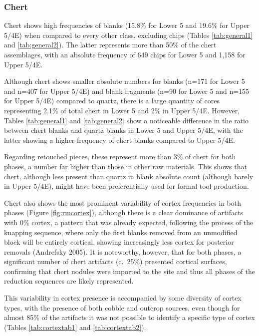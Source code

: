 \documentclass[12pt,twoside]{reedthesis}
\begin{document}
\hypertarget{chert}{%
\subsubsection{Chert}\label{chert}}

Chert shows high frequencies of blanks (15.8\% for Lower 5 and 19.6\% for Upper 5/4E) when compared to every other class, excluding chips (Tables \ref{tab:general1} and \ref{tab:general2}). The latter represents more than 50\% of the chert assemblages, with an absolute frequency of 649 chips for Lower 5 and 1,158 for Upper 5/4E.

Although chert shows smaller absolute numbers for blanks (n=171 for Lower 5 and n=407 for Upper 5/4E) and blank fragments (n=90 for Lower 5 and n=155 for Upper 5/4E) compared to quartz, there is a large quantity of cores representing 2.1\% of total chert in Lower 5 and 2\% in Upper 5/4E. However, Tables \ref{tab:general1} and \ref{tab:general2} show a noticeable difference in the ratio between chert blanks and quartz blanks in Lower 5 and Upper 5/4E, with the latter showing a higher frequency of chert blanks compared to Upper 5/4E.

Regarding retouched pieces, these represent more than 3\% of chert for both phases, a number far higher than those in other raw materials. This shows that chert, although less present than quartz in blank absolute count (although barely in Upper 5/4E), might have been preferentially used for formal tool production.

Chert also shows the most prominent variability of cortex frequencies in both phases (Figure \ref{fig:rmcortex}), although there is a clear dominance of artifacts with 0\% cortex, a pattern that was already expected, following the process of the knapping sequence, where only the first blanks removed from an unmodified block will be entirely cortical, showing increasingly less cortex for posterior removals (Andrefsky 2005). It is noteworthy, however, that for both phases, a significant number of chert artifacts (c.~25\%) presented cortical surfaces, confirming that chert nodules were imported to the site and thus all phases of the reduction sequences are likely represented.

This variability in cortex presence is accompanied by some diversity of cortex types, with the presence of both cobble and outcrop sources, even though for almost 85\% of the artifacts it was not possible to identify a specific type of cortex (Tables \ref{tab:cortextab1} and \ref{tab:cortextab2}).
\end{document}
